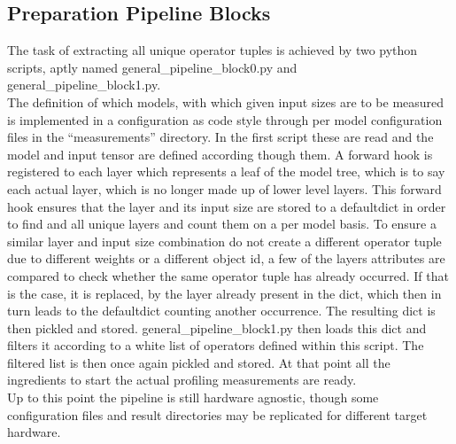 \documentclass[conference]{IEEEtran}
\begin{document}
\subsection{Preparation Pipeline Blocks}
The task of extracting all unique operator tuples is achieved by two python scripts, aptly named general\_pipeline\_block0.py and general\_pipeline\_block1.py. \\
The definition of which models, with which given input sizes are to be measured is implemented in a configuration as code style through per model configuration files in the “measurements” directory. In the first script these are read and the model and input tensor are defined according though them. A forward hook is registered to each layer which represents a leaf of the model tree, which is to say each actual layer, which is no longer made up of lower level layers. This forward hook ensures that the layer and its input size are stored to a defaultdict in order to find and all unique layers and count them on a per model basis. To ensure a similar layer and input size combination do not create a different operator tuple due to different weights or a different object id, a few of the layers attributes are compared to check whether the same operator tuple has already occurred. If that is the case, it is replaced, by the layer already present in the dict, which then in turn leads to the defaultdict counting another occurrence. The resulting dict is then pickled and stored.
general\_pipeline\_block1.py then loads this dict and filters it according to a white list of operators defined within this script. The filtered list is then once again pickled and stored. At that point all the ingredients to start the actual profiling measurements are ready. \\
Up to this point the pipeline is still hardware agnostic, though some configuration files and result directories may be replicated for different target hardware.
\end{document}
